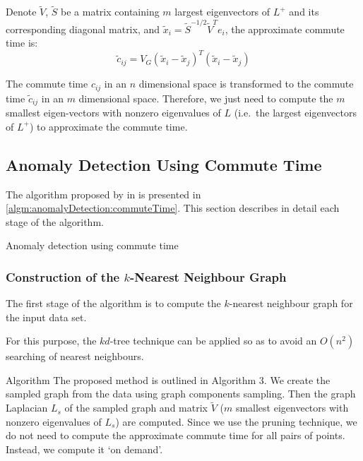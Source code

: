 Denote $\tilde{V}$, $\tilde{S}$ be a matrix containing $m$ largest eigenvectors of $L^+$ and its corresponding diagonal matrix, and $\tilde{x}_i = \tilde{S}^{-1/2}\tilde{V}^Te_i$, the approximate commute time is:
\begin{equation}
    \tilde{c}_{ij} = V_G(\tilde{x}_i - \tilde{x}_j)^T(\tilde{x}_i - \tilde{x}_j)
\end{equation}

The commute time $c_{ij}$ in an $n$ dimensional space is transformed to the commute time $\tilde{c}_{ij}$ in an $m$ dimensional space. Therefore, we just need to compute the $m$ smallest eigen-vectors with nonzero eigenvalues of $L$ (i.e.\ the largest eigenvectors of $L^+$) to approximate the commute time.

\subsection{Anomaly Detection Using Commute Time}
\label{anomalyDetection:commuteTime:algorithm}
The algorithm proposed by \citeauthor{Khoa:2012} in 
\cite{Khoa:2012} is presented in \autoref{algm:anomalyDetection:commuteTime}.
This section describes in detail each stage of the algorithm.

\begin{algorithm}[t]
    
    \caption{Anomaly detection using commute time}
    \label{algm:anomalyDetection:commuteTime}
\end{algorithm}

\subsubsection{Construction of the $k$-Nearest Neighbour Graph}
\label{anomalyDetection:commuteTime:algorithm:knnGraph}
The first stage of the algorithm is to compute the $k$-nearest neighbour graph
for the input data set.

For this purpose, the $kd$-tree technique can be applied so as to avoid an
$O(n^2)$ searching of nearest neighbours.

Algorithm
The proposed method is outlined in Algorithm 3. We create the sampled graph from the data using graph components sampling. Then the graph Laplacian $L_s$ of the sampled graph and matrix $\tilde{V}$ ($m$ smallest eigenvectors with nonzero eigenvalues of $L_s$) are computed. Since we use the pruning technique, we do not need to compute the approximate commute time for all pairs of points. Instead, we compute it `on demand'.

